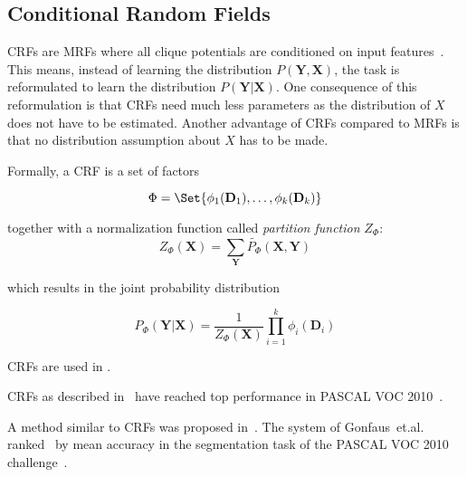 \subsection{Conditional Random Fields}\label{subsec:conditional-random-fields}

\Glspl{CRF} are \glspl{MRF} where all clique potentials are conditioned on
input features~\cite{murphy2012machine}. This means, instead of learning the
distribution $P(\mathbf{Y}, \mathbf{X})$, the task is reformulated to learn the
distribution $P(\mathbf{Y}| \mathbf{X})$. One consequence of this reformulation
is that \glspl{CRF} need much less parameters as the distribution of $X$ does
not have to be estimated. Another advantage of \glspl{CRF} compared to
\glspl{MRF} is that no distribution assumption about $X$ has to be made.

Formally, a \gls{CRF} is a set of factors

\[\Phi = \Set{\phi_1(\mathbf{D}_1), \dots, \phi_k(\mathbf{D}_k)}\]

together with a normalization function called \textit{partition function} $Z_\Phi$:
\[Z_\Phi(\mathbf{X}) = \sum_{\mathbf{Y}} \tilde{P_\Phi} (\mathbf{X}, \mathbf{Y})\]

which results in the joint probability distribution

\[P_{\Phi}(\mathbf{Y} | \mathbf{X}) = \frac{1}{Z_\Phi(\mathbf{X})} \prod_{i=1}^k \phi_i(\mathbf{D}_i)\]


\Glspl{CRF} are used in \cite{multiscale04,shotton2006textonboost}.

\Glspl{CRF} as described in~\cite{associative09} have reached top performance
in PASCAL VOC 2010~\cite{VOC2010Results}.


A method similar to \glspl{CRF} was proposed in~\cite{gonfaus2010harmony}.
The system of Gonfaus~et.al. ranked~ by mean accuracy in the segmentation
task of the PASCAL VOC 2010 challenge~\cite{everingham2010pascal}.
